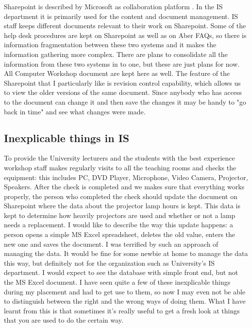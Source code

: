\documentclass[10pt,a4paper,headinclude=true]{report}
\begin{document}
Sharepoint is described by Microsoft as collaboration platform \cite{Sharepoint}. In the IS department it is primarily used  for the content and document management. IS staff keeps different documents relevant to their work on Sharepoint. Some of the help desk procedures are kept on Sharepoint as well as on Aber FAQs, so there is information fragmentation between these two systems and it makes the information gathering more complex. There are plans to consolidate all the information from these two systems in to one, but these are just plans for now. All Computer Workshop document are kept here as well. The feature of the Sharepoint that I particularly like is revision control capability, which allows us to view the older versions of the same document. Since anybody who has access to the document can change it and then save the changes it may be handy to "go back in time" and see what changes were made.

\subsection{Inexplicable things in IS}
\label{sec:stupid}
To provide the University lecturers and the students with the best experience workshop staff makes regularly visits to all the teaching rooms and checks the equipment: this includes PC, DVD Player, Microphone, Video Camera, Projector, Speakers. After the check is completed and we makes sure that everything works properly, the person who completed the check should update the document on Sharepoint where the data about the projector lamp hours is kept. This data is kept to determine how heavily projectors are used and whether or not a lamp needs a replacement. I would like to describe the way this update happens: a person opens a simple MS Excel spreadsheet, deletes the old value, enters the new one and saves the document. I was terrified by such an approach of managing the data. It would be fine for some newbie at home to manage the data this way, but definitely not for the organization such as University's IS department. I would expect to see the database with simple front end, but not the MS Excel document. I have seen quite a few of these inexplicable things during my placement and had to get use to them, so now I may even not be able to distinguish between the right and the wrong ways of doing them. What I have learnt from this is that sometimes it's really useful to get a fresh look at things that you are used to do the certain way.      
\end{document}
